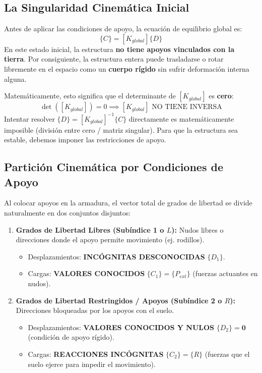 \documentclass[11pt,a4paper]{article}
\begin{document}
\subsection{La Singularidad Cinemática Inicial}
Antes de aplicar las condiciones de apoyo, la ecuación de equilibrio global es:
\begin{equation}
    \{C\} = [K_{global}] \{D\}
\end{equation}
En este estado inicial, la estructura \textbf{no tiene apoyos vinculados con la tierra}. Por consiguiente, la estructura entera puede trasladarse o rotar libremente en el espacio como un \textbf{cuerpo rígido} sin sufrir deformación interna alguna.

Matemáticamente, esto significa que el determinante de $[K_{global}]$ es \textbf{cero}:
\begin{equation}
    \det([K_{global}]) = 0 \implies [K_{global}] \text{ NO TIENE INVERSA}
\end{equation}
Intentar resolver $\{D\} = [K_{global}]^{-1} \{C\}$ directamente es matemáticamente imposible (división entre cero / matriz singular). Para que la estructura sea estable, debemos imponer las restricciones de apoyo.

\subsection{Partición Cinemática por Condiciones de Apoyo}
Al colocar apoyos en la armadura, el vector total de grados de libertad se divide naturalmente en dos conjuntos disjuntos:
\begin{enumerate}
    \item \textbf{Grados de Libertad Libres (Subíndice 1 o $L$):} Nudos libres o direcciones donde el apoyo permite movimiento (ej. rodillos).
    \begin{itemize}
        \item Desplazamientos: \textbf{INCÓGNITAS DESCONOCIDAS} $\{D_1\}$.
        \item Cargas: \textbf{VALORES CONOCIDOS} $\{C_1\} = \{P_{ext}\}$ (fuerzas actuantes en nudos).
    \end{itemize}
    \item \textbf{Grados de Libertad Restringidos / Apoyos (Subíndice 2 o $R$):} Direcciones bloqueadas por los apoyos con el suelo.
    \begin{itemize}
        \item Desplazamientos: \textbf{VALORES CONOCIDOS Y NULOS} $\{D_2\} = \mathbf{0}$ (condición de apoyo rígido).
        \item Cargas: \textbf{REACCIONES INCÓGNITAS} $\{C_2\} = \{R\}$ (fuerzas que el suelo ejerce para impedir el movimiento).
    \end{itemize}
\end{enumerate}
\end{document}
